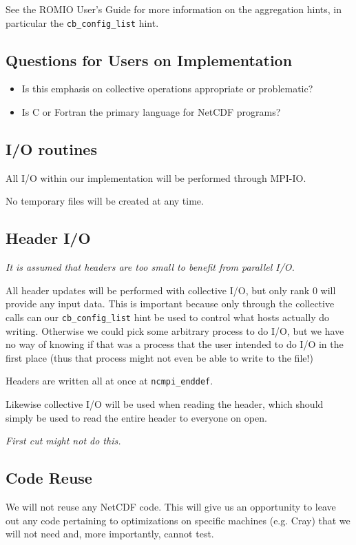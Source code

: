 \documentclass[10pt]{article}
\begin{document}
See the ROMIO User's Guide for more information on the aggregation hints, in
particular the \texttt{cb\_config\_list} hint.

\subsection{Questions for Users on Implementation}
\begin{itemize}
\item Is this emphasis on collective operations appropriate or problematic?
\item Is C or Fortran the primary language for NetCDF programs?
\end{itemize}

\subsection{I/O routines}

All I/O within our implementation will be performed through MPI-IO.

No temporary files will be created at any time.

%
%
\subsection{Header I/O}

\emph{It is assumed that headers are too small to benefit from parallel I/O.}

All header updates will be performed with collective I/O, but only rank 0 will
provide any input data.  This is important because only through the collective
calls can our \texttt{cb\_config\_list} hint be used to control what hosts
actually do writing.  Otherwise we could pick some arbitrary process to do
I/O, but we have no way of knowing if that was a process that the user
intended to do I/O in the first place (thus that process might not even be
able to write to the file!)

Headers are written all at once at \texttt{ncmpi\_enddef}.

Likewise collective I/O will be used when reading the header, which should
simply be used to read the entire header to everyone on open.

\emph{First cut might not do this.}

\subsection{Code Reuse}
We will not reuse any NetCDF code.  This will give us an opportunity to leave
out any code pertaining to optimizations on specific machines (e.g. Cray) that
we will not need and, more importantly, cannot test.
\end{document}
